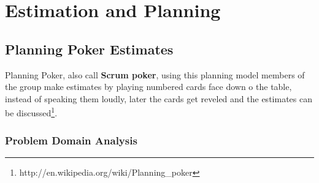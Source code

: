 \renewcommand{\headrulewidth}{0.1pt}
\renewcommand{\footrulewidth}{0.1pt}

\section*{Estimation and Planning}


\subsection*{Planning Poker Estimates}

Planning Poker, also call \textbf{Scrum poker}, using this planning model members of the group make estimates by playing numbered cards face down o the table, instead of speaking them loudly, later the cards get reveled and the estimates can be discussed\footnote{http://en.wikipedia.org/wiki/Planning_poker}.

\subsubsection*{Problem Domain Analysis}

